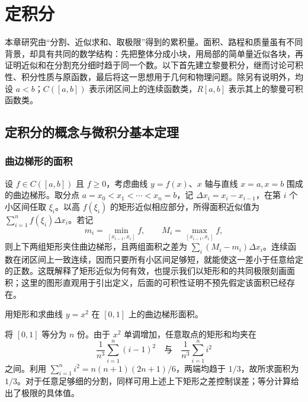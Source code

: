 \setcounter{chapter}{6} %
\chapter{定积分}
\label{chap:definite-integrals}

本章研究由“分割、近似求和、取极限”得到的累积量。面积、路程和质量虽有不同背景，却具有共同的数学结构：先把整体分成小块，用局部的简单量近似各块，再证明近似和在分割充分细时趋于同一个数。以下首先建立黎曼积分，继而讨论可积性、积分性质与原函数，最后将这一思想用于几何和物理问题。除另有说明外，均设 $a<b$；$C([a,b])$ 表示闭区间上的连续函数类，$R[a,b]$ 表示其上的黎曼可积函数类。

\section{定积分的概念与微积分基本定理}
\label{sec:definite-integrals-and-fundamental-theorem}

\subsection{曲边梯形的面积}
\label{subsec:area-of-curvilinear-trapezoids}

设 $f\in C([a,b])$ 且 $f\geq0$，考虑曲线 $y=f(x)$、$x$ 轴与直线 $x=a,x=b$ 围成的曲边梯形。取分点 $a=x_0<x_1<\cdots<x_n=b$，记 $\Delta x_i=x_i-x_{i-1}$，在第 $i$ 个小区间任取 $\xi_i$。以高 $f(\xi_i)$ 的矩形近似相应部分，所得面积近似值为 $\sum_{i=1}^n f(\xi_i)\Delta x_i$。若记
\[
    m_i=\min_{[x_{i-1},x_i]}f,\qquad
    M_i=\max_{[x_{i-1},x_i]}f,
\]
则上下两组矩形夹住曲边梯形，且两组面积之差为 $\sum_i(M_i-m_i)\Delta x_i$。连续函数在闭区间上一致连续，因而只要所有小区间足够短，就能使这一差小于任意给定的正数。这既解释了矩形近似为何有效，也提示我们以矩形和的共同极限刻画面积；这里的图形直观用于引出定义，后面的可积性证明不预先假定该面积已经存在。

\begin{example}
\label{ex:riemann-area-square-function}
用矩形和求曲线 $y=x^2$ 在 $[0,1]$ 上的曲边梯形面积。
\end{example}
\begin{solve}
将 $[0,1]$ 等分为 $n$ 份。由于 $x^2$ 单调增加，任意取点的矩形和均夹在
\[
    \frac1{n^3}\sum_{i=1}^n(i-1)^2
    \quad\text{与}\quad
    \frac1{n^3}\sum_{i=1}^n i^2
\]
之间。利用 $\sum_{i=1}^n i^2=n(n+1)(2n+1)/6$，两端均趋于 $1/3$，故所求面积为 $1/3$。对于任意足够细的分割，同样可用上述上下矩形之差控制误差；等分计算给出了极限的具体值。
\end{solve}

